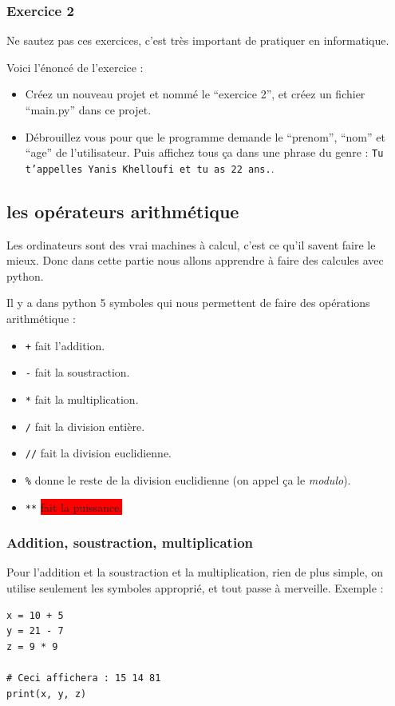 \documentclass[12pt]{article}
\newcommand{\code}[1]{\colorbox{light-gray}{\texttt{#1}}}
\begin{document}
        \subsubsection{Exercice 2}
            Ne sautez pas ces exercices, c'est très important de pratiquer en informatique.

            Voici l'énoncé de l'exercice :
            \begin{itemize}
                \item Créez un nouveau projet et nommé le ``exercice 2'', et créez un fichier ``main.py'' dans ce
                    projet.
                \item Débrouillez vous pour que le programme demande le ``prenom'', ``nom'' et ``age'' de l'utilisateur.
                    Puis affichez tous ça dans une phrase du genre : \code{Tu t'appelles Yanis Khelloufi et tu as 22 ans.}.
            \end{itemize}


\clearpage

    \subsection{les opérateurs arithmétique}
        Les ordinateurs sont des vrai machines à calcul, c'est ce qu'il savent faire le mieux. Donc dans cette partie
        nous allons apprendre à faire des calcules avec python.

        Il y a dans python 5 symboles qui nous permettent de faire des opérations arithmétique :
        \begin{itemize}
            \item \code{+} fait l'addition.
            \item \code{-} fait la soustraction.
            \item \code{*} fait la multiplication.
            \item \code{/} fait la division entière.
            \item \code{//} fait la division euclidienne.
            \item \code{\%} donne le reste de la division euclidienne (on appel ça le \emph{modulo}).
            \item \code{**} \colorbox{red}{fait la puissance.}
        \end{itemize}

        \subsubsection{Addition, soustraction, multiplication}
            Pour l'addition et la soustraction et la multiplication, rien de plus simple, on utilise seulement 
            les symboles approprié, et tout passe à merveille. Exemple :
            \begin{lstlisting}[style=code]
x = 10 + 5
y = 21 - 7
z = 9 * 9

# Ceci affichera : 15 14 81
print(x, y, z) 
            \end{lstlisting}
\end{document}
